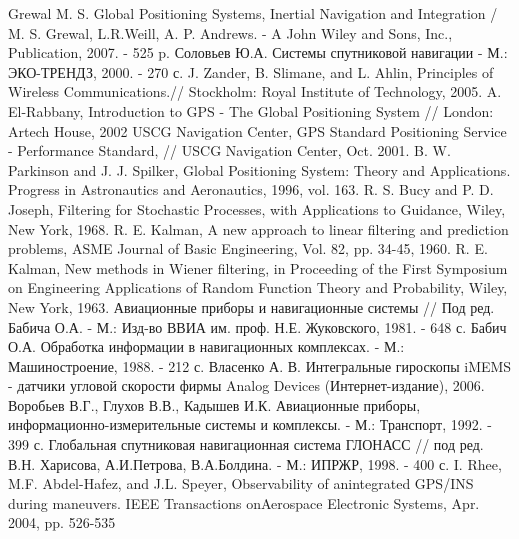 \begin{thebibliography}{99}
 Grewal M. S. Global Positioning Systems, Inertial Navigation and Integration / M. S. Grewal, L.R.Weill, A. P. Andrews. - A John Wiley and Sons, Inc., Publication, 2007. - 525 p.
 Соловьев Ю.А. Системы спутниковой навигации - М.: ЭКО-ТРЕНДЗ, 2000.  - 270 с. 
 J. Zander, B. Slimane, and L. Ahlin, Principles of Wireless Communications.// Stockholm: Royal Institute of Technology, 2005.
 A. El-Rabbany, Introduction to GPS - The Global Positioning System // London: Artech House, 2002
 USCG Navigation Center, GPS Standard Positioning Service - Performance Standard, // USCG Navigation Center, Oct. 2001.
 B. W. Parkinson and J. J. Spilker, Global Positioning System: Theory and
 Applications. Progress in Astronautics and Aeronautics, 1996, vol. 163.
 R. S. Bucy and P. D. Joseph, Filtering for Stochastic Processes, with Applications to Guidance, Wiley, New York, 1968.
 R. E. Kalman, A new approach to linear filtering and prediction problems, ASME Journal of Basic Engineering, Vol. 82, pp. 34-45, 1960.
 R. E. Kalman, New methods in Wiener filtering,  in Proceeding of the First Symposium on Engineering Applications of 
Random Function Theory and Probability, Wiley, New York, 1963.
 Авиационные приборы и навигационные системы // Под  ред. Бабича О.А. - М.: Изд-во ВВИА им. проф. Н.Е. Жуковского, 1981. - 648 с.
 Бабич О.А. Обработка информации в навигационных комплексах. - М.: Машиностроение, 1988.  - 212 с.
 Власенко А. В. Интегральные гироскопы iMEMS - датчики угловой скорости фирмы Analog Devices (Интернет-издание), 2006.
 Воробьев В.Г., Глухов В.В., Кадышев И.К. Авиационные приборы, информационно-измерительные системы и комплексы. - М.: Транспорт, 1992.  - 399 с.
 Глобальная спутниковая навигационная система ГЛОНАСС // под ред. В.Н. Харисова, А.И.Петрова, В.А.Болдина. - М.: ИПРЖР, 1998.  - 400 с. 
 I. Rhee, M.F. Abdel-Hafez, and J.L. Speyer, Observability of anintegrated GPS/INS during maneuvers. IEEE Transactions onAerospace  Electronic Systems, Apr. 2004, pp. 526-535



\end{thebibliography}
